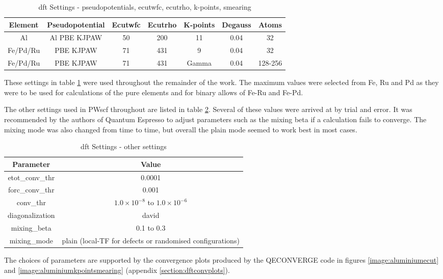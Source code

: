 \begin{table}[h]
\begin{center}
\renewcommand{\arraystretch}{1.2}
\begin{tabular}{c c c c c c c}
\hline\hline
Element & Pseudopotential & Ecutwfc & Ecutrho & K-points & Degauss & Atoms\\
\hline\hline
Al & Al PBE KJPAW & 50 & 200 & 11 & 0.04 & 32\\
Fe/Pd/Ru & PBE KJPAW & 71 & 431 & 9 & 0.04 & 32 \\ 
Fe/Pd/Ru & PBE KJPAW & 71 & 431 & Gamma & 0.04 & 128-256 \\ 
\hline\hline
\end{tabular}
\end{center}
\caption{\acrshort{dft} Settings - pseudopotentials, ecutwfc, ecutrho, k-points, smearing}
\label{table:dftsettingsa}
\end{table}
\FloatBarrier

These settings in table \ref{table:dftsettingsa} were used throughout the remainder of the work.  The maximum values were selected from Fe, Ru and Pd as they were to be used for calculations of the pure elements and for binary allows of Fe-Ru and Fe-Pd.

The other settings used in PWscf throughout are listed in table \ref{table:dftsettingsb}.  Several of these values were arrived at by trial and error.  It was recommended by the authors of Quantum Espresso to adjust parameters such as the mixing beta if a calculation fails to converge.  The mixing mode was also changed from time to time, but overall the plain mode seemed to work best in most cases.

\begin{table}[h]
\begin{center}
\renewcommand{\arraystretch}{1.2}
\begin{tabular}{c c}
\hline\hline
Parameter & Value \\
\hline\hline
etot\_conv\_thr & 0.0001 \\
forc\_conv\_thr & 0.001 \\ 
conv\_thr & $1.0 \times 10^{-8}$ to $1.0 \times 10^{-6}$ \\ 
diagonalization & david \\ 
mixing\_beta & 0.1 to 0.3 \\ 
mixing\_mode & plain (local-TF for defects or randomised configurations) \\ 
\hline\hline
\end{tabular}
\end{center}
\caption{\acrshort{dft} Settings - other settings}
\label{table:dftsettingsb}
\end{table}

\FloatBarrier

The choices of parameters are supported by the convergence plots produced by the QECONVERGE code in figures \ref{image:aluminiumecut} and \ref{image:aluminiumkpointsmearing} (appendix \ref{section:dftconvplots}).



